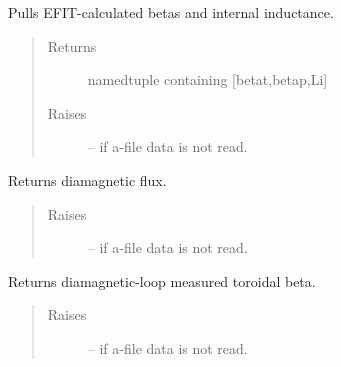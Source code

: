 \documentclass[letterpaper,10pt,english]{sphinxmanual}
\begin{document}
\begin{fulllineitems}
\begin{fulllineitems}
\begin{quote}
\begin{description}
\end{description}\end{quote}

\end{fulllineitems}


\begin{fulllineitems}
\label{eqtools:eqtools.eqdskreader.EqdskReader.getBetas}
Pulls EFIT-calculated betas and internal inductance.
\begin{quote}\begin{description}
\item[{Returns}] \leavevmode
namedtuple containing {[}betat,betap,Li{]}

\item[{Raises}] \leavevmode
{} -- 
if a-file data is not read.

\end{description}\end{quote}

\end{fulllineitems}


\begin{fulllineitems}
\label{eqtools:eqtools.eqdskreader.EqdskReader.getDiamagFlux}
Returns diamagnetic flux.
\begin{quote}\begin{description}
\item[{Raises}] \leavevmode
{} -- 
if a-file data is not read.

\end{description}\end{quote}

\end{fulllineitems}


\begin{fulllineitems}
\label{eqtools:eqtools.eqdskreader.EqdskReader.getDiamagBetaT}
Returns diamagnetic-loop measured toroidal beta.
\begin{quote}\begin{description}
\item[{Raises}] \leavevmode
{} -- 
if a-file data is not read.


\end{description}
\end{quote}
\end{fulllineitems}
\end{fulllineitems}
\end{document}

